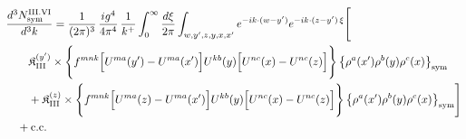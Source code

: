 \begingroup\small
\begin{align}\label{eq:H-III.VI-3}
&\frac{d^{3}N^{\rm III.VI}_{{\rm sym}}}{d^{3}k}=\frac{1}{(2\pi)^{3}}\, \frac{ig^{4}}{4\pi^{4}}\, \frac{1}{k^{+}} \int_{0}^{\infty}\frac{d\xi}{2\pi} \int_{w,y',z,y,x,x'}e^{-ik\cdot(w-y')}e^{-ik\cdot(z-y')\,\xi}\Bigg[\notag\\
&\quad\quad \mathfrak{K}^{(y')}_{\rm III} \times \Bigg\{f^{mnk}\Big[U^{ma}(y')-U^{ma}(x')\Big]U^{kb}(y)\Big[U^{nc}(x)-U^{nc}(z)\Big]\Bigg\}\, \big\{\rho^{a}(x')\rho^{b}(y)\rho^{c}(x)\big\}_{\rm sym}\notag\\
&\quad\quad + \mathfrak{K}^{(z)}_{\rm III} \times \Bigg\{f^{mnk}\Big[U^{ma}(z)-U^{ma}(x')\Big]U^{kb}(y)\Big[U^{nc}(x)-U^{nc}(z)\Big]\Bigg\}\, \big\{\rho^{a}(x')\rho^{b}(y)\rho^{c}(x)\big\}_{\rm sym}\Bigg]\notag\\
&\quad +{\rm c.c.}
\end{align}
\endgroup
